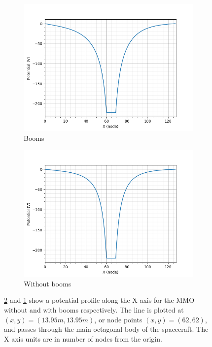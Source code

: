 \begin{center}
    \begin{figure}[H]
      \begin{subfigure}[b]{0.61\textwidth}
      \includegraphics[width=\textwidth]{figures/MMO/noPH/WB/L_noPH_WB.png}
      \caption{Booms}
      \label{fig:L_noPH_WB}
    \end{subfigure}
    \begin{subfigure}[b]{0.61\textwidth}
      \includegraphics[width=\textwidth]{figures/MMO/noPH/NB/L_noPH_NB.png}
      \caption{Without booms}
      \label{fig:L_noPH_NB}
    \end{subfigure}
  \caption{\ref{fig:L_noPH_NB} and \ref{fig:L_noPH_WB} show a potential profile along the X axis for the MMO without and with booms respectively. The line is plotted at $(x,y) = (13.95 m, 13.95 m)$, or node points $(x,y) = (62,62)$, and passes through the main octagonal body of the spacecraft. The X axis units are in number of nodes from the origin.}
\label{fig:Line_noPH_comb}
  \end{figure}
\end{center}

